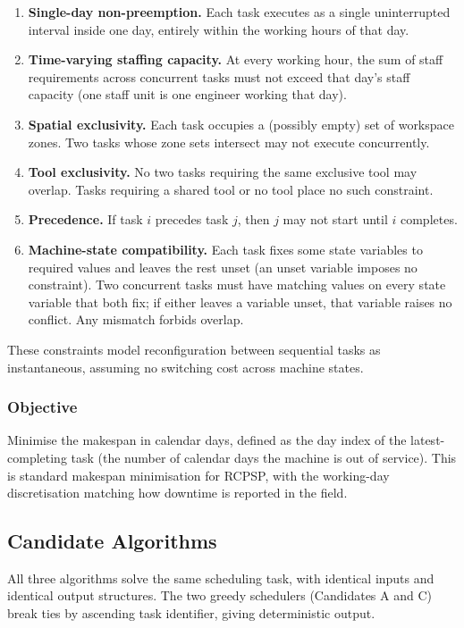 \documentclass[conference]{IEEEtran}
\begin{document}
\begin{enumerate}
  \item \textbf{Single-day non-preemption.} Each task executes as a
  single uninterrupted interval inside one day, entirely within the
  working hours of that day.
  \item \textbf{Time-varying staffing capacity.} At every working
  hour, the sum of staff requirements across concurrent tasks
  must not exceed that day's staff capacity (one staff unit is one
  engineer working that day).
  \item \textbf{Spatial exclusivity.} Each task occupies a (possibly
  empty) set of workspace zones. Two tasks whose zone sets intersect
  may not execute concurrently.
  \item \textbf{Tool exclusivity.} No two tasks requiring the same
  exclusive tool may overlap. Tasks requiring a
  shared tool or no tool place no such constraint.
  \item \textbf{Precedence.} If task $i$ precedes task $j$, then $j$
  may not start until $i$ completes.
  \item \textbf{Machine-state compatibility.} Each task fixes some
  state variables to required values and leaves the rest unset (an
  unset variable imposes no constraint). Two concurrent tasks must
  have matching values on every state variable that both fix; if
  either leaves a variable unset, that variable raises no conflict.
  Any mismatch forbids overlap.
\end{enumerate}

These constraints model reconfiguration between sequential tasks as
instantaneous, assuming no switching cost across machine states.

\subsubsection{Objective}

Minimise the makespan in calendar days, defined as the day index of
the latest-completing task (the number of calendar days the machine
is out of service). This is standard makespan minimisation for
RCPSP, with the working-day discretisation matching how downtime is
reported in the field.

\subsection{Candidate Algorithms}

All three algorithms solve the same scheduling task, with identical
inputs and identical output structures. The two greedy schedulers
(Candidates A and C) break ties by ascending task identifier, giving
deterministic output.
\end{document}
